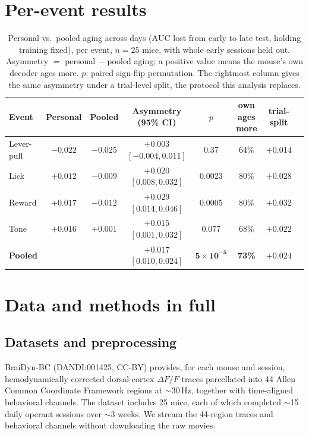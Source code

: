 \documentclass[mlabstract,onecolumn]{jmlr}
\newcommand{\auc}{\mathrm{AUC}}
\begin{document}
\section{Per-event results}
\label{app:perevent}
\begin{table}[H]\centering\small
\caption{Personal vs.\ pooled aging across days ($\auc$ lost from early to late test, holding
training fixed), per event, $n = 25$ mice, with whole early sessions held out. Asymmetry $=$
personal $-$ pooled aging; a positive value means the mouse's own decoder ages more. $p$: paired
sign-flip permutation. The rightmost column gives the same asymmetry under a trial-level split, the
protocol this analysis replaces.}
\label{tab:asym}
\setlength{\tabcolsep}{4pt}
\begin{tabular}{lccccccc}
\toprule
Event & Personal & Pooled & Asymmetry (95\% CI) & $p$ & own ages more & trial-split \\
\midrule
Lever-pull & $-0.022$ & $-0.025$ & $+0.003$ $[-0.004, 0.011]$ & 0.37 & 64\% & $+0.014$ \\
Lick       & $+0.012$ & $-0.009$ & $+0.020$ $[0.008, 0.032]$ & 0.0023 & 80\% & $+0.028$ \\
Reward     & $+0.017$ & $-0.012$ & $+0.029$ $[0.014, 0.046]$ & 0.0005 & 80\% & $+0.032$ \\
Tone       & $+0.016$ & $+0.001$ & $+0.015$ $[0.001, 0.032]$ & 0.077 & 68\% & $+0.022$ \\
\midrule
\textbf{Pooled} & & & $\mathbf{+0.017}$ $[0.010, 0.024]$ & $\mathbf{5\times10^{-5}}$ & \textbf{73\%} & $+0.024$ \\
\bottomrule
\end{tabular}
\end{table}

\section{Data and methods in full}
\label{app:methods}
\subsection{Datasets and preprocessing}
BraiDyn-BC \citep{kondo2025} (DANDI:001425, CC-BY) provides, for each mouse and
session, hemodynamically corrected dorsal-cortex $\Delta F/F$ traces parcellated into 44 Allen Common
Coordinate Framework regions at $\sim$30\,Hz, together with time-aligned behavioral channels. The
dataset includes 25 mice, each of which completed $\sim$15 daily operant sessions over $\sim$3 weeks.
We stream the 44-region traces and behavioral channels without downloading the raw movies.
\end{document}
